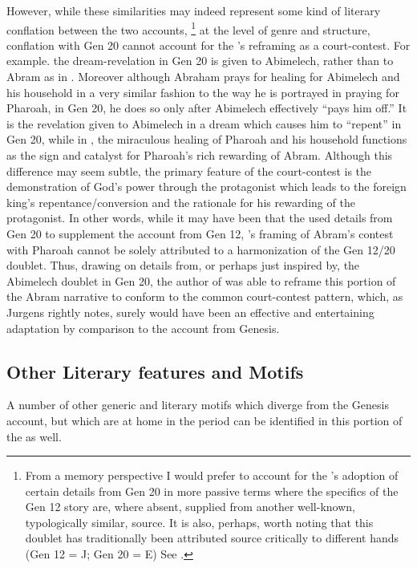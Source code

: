 However, while these similarities may indeed represent some kind of literary conflation between the two accounts,%
%
\footnote{From a memory perspective I would prefer to account for the \ga's adoption of certain details from Gen 20 in more passive terms where the specifics of the Gen 12 story are, where absent, supplied from another well-known, typologically similar, source. It is also, perhaps, worth noting that this doublet has traditionally been attributed source critically to different hands (Gen 12 = J; Gen 20 = E) See \cite[15]{driver1956} .} 
%
at the level of genre and structure, conflation with Gen 20 cannot account for the \ga's reframing as a court-contest. For example. the dream-revelation in Gen 20 is given to Abimelech, rather than to Abram as in \ga. Moreover although Abraham prays for healing for Abimelech and his household in a very similar fashion to the way he is portrayed in \ga praying for Pharoah, in Gen 20, he does so only after Abimelech effectively ``pays him off.'' It is the revelation given to Abimelech in a dream which causes him to ``repent'' in Gen 20, while in \ga, the miraculous healing of Pharoah and his household functions as the sign and catalyst for Pharoah's rich rewarding of Abram. Although this difference may seem subtle, the primary feature of the court-contest is the demonstration of God's power through the protagonist which leads to the foreign king's repentance/conversion and the rationale for his rewarding of the protagonist. In other words, while it may have been that the \ga used details from Gen 20 to supplement the account from Gen 12, \ga's framing of Abram's contest with Pharoah cannot be solely attributed to a harmonization of the Gen 12/20 doublet. Thus, drawing on details from, or perhaps just inspired by, the Abimelech doublet in Gen 20, the author of \ga was able to reframe this portion of the Abram narrative to conform to the common court-contest pattern, which, as Jurgens rightly notes, surely would have been an effective and entertaining adaptation by comparison to the account from Genesis.

\subsection{Other Literary features and Motifs}
A number of other generic and literary motifs which diverge from the Genesis account, but which are at home in the \secondtemple period can be identified in this portion of the \ga as well.

